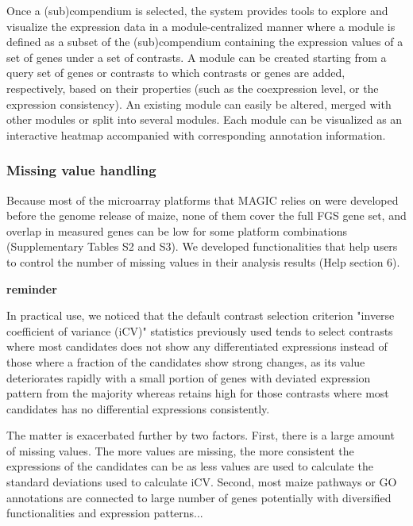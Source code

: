 Once a (sub)compendium is selected, the system provides tools to explore 
and visualize the expression data in a module-centralized manner
where a module is defined as a subset of the (sub)compendium containing
the expression values of a set of genes under a set of contrasts. A module
can be created starting from a query set of genes or contrasts to which
contrasts or genes are added, respectively, based on their properties (such
as the coexpression level, or the expression consistency). An existing
module can easily be altered, merged with other modules or split into
several modules. Each module can be visualized as an interactive heatmap
accompanied with corresponding annotation information.


\subsubsection{Missing value handling}

Because most of the microarray platforms that MAGIC relies on were 
developed before the genome release of maize, none of them cover the full
FGS gene set, and overlap in measured genes can be low for some platform 
combinations (Supplementary Tables S2 and S3). We developed
functionalities that help users to control the number of missing values
in their analysis results (Help section 6).


\textbf{reminder}

In practical use, we noticed that the default contrast selection criterion "inverse coefficient of variance (iCV)" statistics previously used tends to select contrasts where most candidates does not show any differentiated expressions instead of those where a fraction of the candidates show strong changes, as its value deteriorates rapidly with a small portion of genes with deviated expression pattern from the majority whereas retains high for those contrasts where most candidates has no differential expressions consistently.

The matter is exacerbated further by two factors. First, there is a large amount of missing values. The more values are missing, the more consistent the expressions of the candidates can be as less values are used to calculate the standard deviations used to calculate iCV. Second, most maize pathways or GO annotations are connected to large number of genes potentially with diversified functionalities and expression patterns... 

